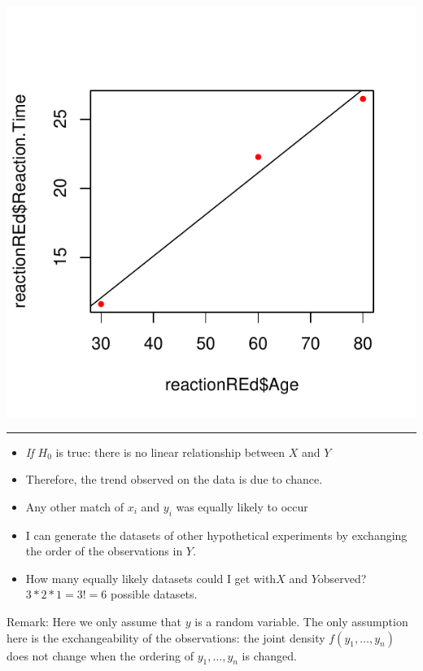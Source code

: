 \documentclass[]{article}
\providecommand{\tightlist}{%
  \setlength{\itemsep}{0pt}\setlength{\parskip}{0pt}}
\begin{document}
\begin{center}\includegraphics{inference_booklet_files/figure-latex/unnamed-chunk-7-1} \end{center}

\begin{center}\rule{0.5\linewidth}{\linethickness}\end{center}

\begin{itemize}
\tightlist
\item
  \emph{If \(H_0\)} is true: there is no linear relationship between
  \(X\) and \(Y\)
\item
  Therefore, the trend observed on the data is due to chance.
\item
  Any other match of \(x_i\) and \(y_i\) was equally likely to occur
\item
  I can generate the datasets of other hypothetical experiments by
  exchanging the order of the observations in \(Y\).
\item
  How many equally likely datasets could I get with\(X\) and
  \(Y\)observed? \(3 * 2 * 1=3!=6\) possible datasets.
\end{itemize}

Remark: Here we only assume that \(y\) is a random variable. The only
assumption here is the exchangeability of the observations: the joint
density \(f(y_1,\ldots,y_n)\) does not change when the ordering of
\(y_1,\ldots,y_n\) is changed.
\end{document}
